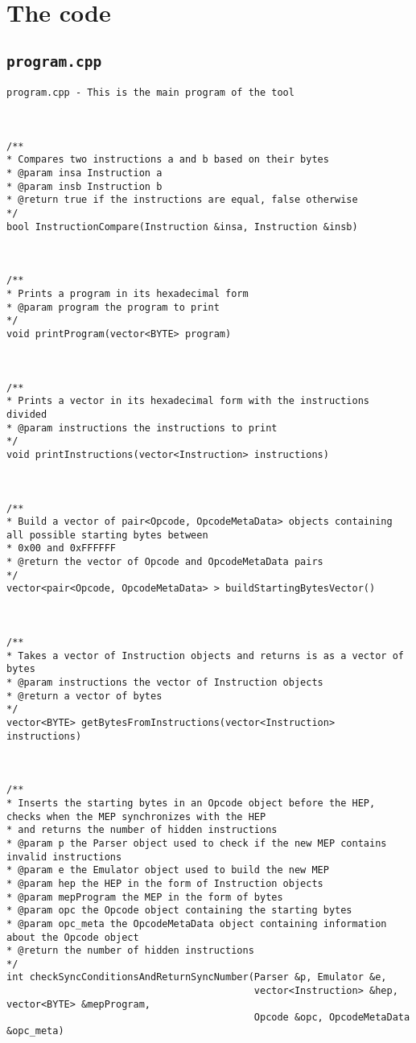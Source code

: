 \documentclass[11pt,twoside]{eitExjobb}
\begin{document}
{}


\appendix
\chapter{The code}
\section{\texttt{program.cpp}}

\begin{Verbatim}[fontsize=\tiny]
program.cpp - This is the main program of the tool



/**
* Compares two instructions a and b based on their bytes
* @param insa Instruction a
* @param insb Instruction b
* @return true if the instructions are equal, false otherwise
*/
bool InstructionCompare(Instruction &insa, Instruction &insb)



/**
* Prints a program in its hexadecimal form
* @param program the program to print
*/
void printProgram(vector<BYTE> program)



/**
* Prints a vector in its hexadecimal form with the instructions divided
* @param instructions the instructions to print
*/
void printInstructions(vector<Instruction> instructions)



/**
* Build a vector of pair<Opcode, OpcodeMetaData> objects containing all possible starting bytes between 
* 0x00 and 0xFFFFFF
* @return the vector of Opcode and OpcodeMetaData pairs 
*/
vector<pair<Opcode, OpcodeMetaData> > buildStartingBytesVector()



/**
* Takes a vector of Instruction objects and returns is as a vector of bytes
* @param instructions the vector of Instruction objects
* @return a vector of bytes
*/
vector<BYTE> getBytesFromInstructions(vector<Instruction> instructions)



/**
* Inserts the starting bytes in an Opcode object before the HEP, checks when the MEP synchronizes with the HEP 
* and returns the number of hidden instructions
* @param p the Parser object used to check if the new MEP contains invalid instructions
* @param e the Emulator object used to build the new MEP
* @param hep the HEP in the form of Instruction objects
* @param mepProgram the MEP in the form of bytes
* @param opc the Opcode object containing the starting bytes
* @param opc_meta the OpcodeMetaData object containing information about the Opcode object
* @return the number of hidden instructions
*/
int checkSyncConditionsAndReturnSyncNumber(Parser &p, Emulator &e, 
                                           vector<Instruction> &hep, vector<BYTE> &mepProgram, 
                                           Opcode &opc, OpcodeMetaData &opc_meta)




\end{Verbatim}
\end{document}
